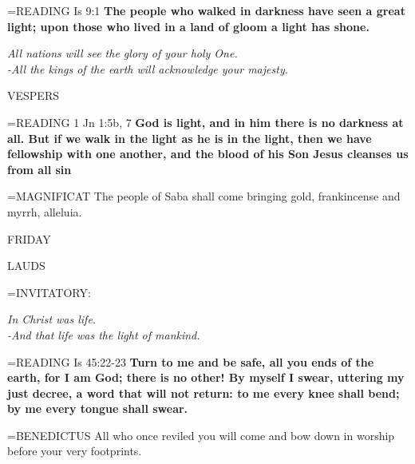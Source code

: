\hangindent=\parindent \small{\uppercase{READING}}   Is 9:1 \textbf{  The people who walked in darkness have seen a great light; upon those who lived in a land of gloom a light has shone.\\}

\begin{center}
\textit{All nations will see the glory of your holy One.\\
-All the kings of the earth will acknowledge your majesty.}
\end{center}

\begin{flushleft}\normalsize VESPERS\\\end{flushleft}

\hangindent=\parindent \small{\uppercase{READING}}   1 Jn 1:5b, 7 \textbf{   God is light, and in him there is no darkness at all. But if we walk in the light as he is in the light, then we have fellowship with one another, and the blood of his Son Jesus cleanses us from all sin\\}

\hangindent=\parindent \small{MAGNIFICAT 	The people of Saba shall come bringing gold, frankincense and myrrh, alleluia.\\}

\begin{center}
\normalsize FRIDAY
\end{center}

\begin{flushleft}\normalsize LAUDS\\\end{flushleft}

\hangindent=\parindent \small{INVITATORY:}
\begin{center}
\textit{In Christ was life.\\}
\textit{-And that life was the light of mankind.\\}
\end{center}

\hangindent=\parindent \small{\uppercase{READING}}   Is 45:22-23 \textbf{  Turn to me and be safe, all you ends of the earth, for I am God; there is no other! By myself I swear, uttering my just decree, a word that will not return: to me every knee shall bend; by me every tongue shall swear.\\}

\hangindent=\parindent \small{BENEDICTUS 	All who once reviled you will come and bow down in worship before your very footprints.\\}

